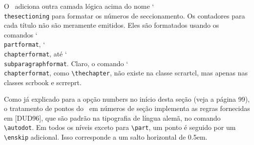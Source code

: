 O \KOMAScript\ adiciona outra camada lógica acima do nome \char`\\\texttt{the\-sec\-tio\-ning} para formatar os números de seccionamento. Os contadores para cada título não são meramente emitidos. Eles são formatados usando os comandos \char`\\\texttt{part\-for\-mat}, \char`\\\texttt{chap\-ter\-for\-mat}, até \char`\\\texttt{sub\-pa\-ra\-graph\-for\-mat}. Claro, o comando \char`\\\texttt{chap\-ter\-for\-mat}, como \verb|\thechapter|, não existe na classe scrartcl, mas apenas nas classes scrbook e scrreprt.

Como já explicado para a opção numbers no início desta seção (veja a página 99), o tratamento de pontos do \KOMAScript\ em números de seção implementa as regras fornecidas em [DUD96], que são padrão na tipografia de língua alemã, no comando \verb|\autodot|. Em todos os níveis exceto para \verb|\part|, um ponto é seguido por um \verb|\enskip| adicional. Isso corresponde a um salto horizontal de 0.5em.
